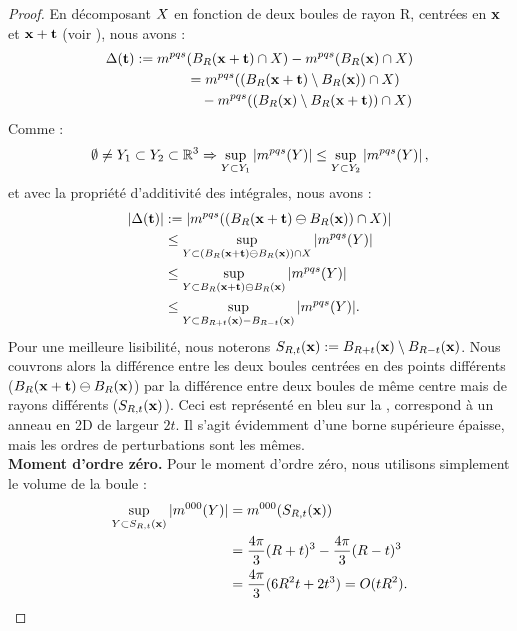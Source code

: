 \begin{proof}
En décomposant $X$ en fonction de deux boules de rayon R, centrées en $\mathbf{x}$
et $\mathbf{x} + \mathbf{t}$ (voir ), nous avons :
%
\begin{align}
  \Delta(\mathbf{t}) := m^{pqs}&(B_{R}(\mathbf{x}+\mathbf{t}) \cap X ) - m^{pqs}(B_{R}(\mathbf{x}) \cap X ) \\
    &= m^{pqs}( (B_{R}(\mathbf{x}+\mathbf{t}) \setminus B_{R}(\mathbf{x})) \cap X ) \\
    & \quad - m^{pqs}( (B_{R}(\mathbf{x}) \setminus B_{R}(\mathbf{x}+\mathbf{t})) \cap X )
\end{align}
%
Comme :
%
\begin{equation}
  \emptyset \neq Y_1 \subset Y_2 \subset \mathbb{R}^3 \Rightarrow \sup_{ Y \subset Y_1} \left | m^{pqs}(Y) \right| \le \sup_{Y \subset Y_2} \left| m^{pqs}(Y)\right |,
\end{equation}
%
et avec la propriété d'additivité des intégrales, nous avons :
%
\begin{align}
  |\Delta(\mathbf{t})| &:= |m^{pqs}( (B_{R}(\mathbf{x}+\mathbf{t}) \ominus B_{R}(\mathbf{x})) \cap X )| \\
  &\le \sup_{Y \subset (B_{R}(\mathbf{x}+\mathbf{t}) \ominus B_{R}(\mathbf{x})) \cap X} |m^{pqs}(Y)|\\
  &\le \sup_{Y \subset B_{R}(\mathbf{x}+\mathbf{t}) \ominus B_{R}(\mathbf{x})} |m^{pqs}(Y)|\\
  &\le \sup_{Y \subset B_{R+t}(\mathbf{x}) - B_{R-t}(\mathbf{x})} |m^{pqs}(Y)|.
\end{align}
%
Pour une meilleure lisibilité, nous noterons $S_{R,t}(\mathbf{x}) :=
B_{R+t}(\mathbf{x}) \setminus B_{R-t}(\mathbf{x})$. Nous couvrons alors la différence
entre les deux boules centrées en des points différents ($B_{R}(\mathbf{x}+\mathbf{t})
\ominus B_{R}(\mathbf{x})$) par la différence entre deux boules de même centre mais
de rayons différents ($S_{R,t}(\mathbf{x})$). Ceci est représenté
en bleu sur la , correspond à un anneau en 2D de
largeur $2t$. Il s'agit évidemment d'une borne supérieure épaisse, mais les
ordres de perturbations sont les mêmes.
%
\textbf{\\Moment d'ordre zéro.\quad}
%
Pour le moment d'ordre zéro, nous utilisons simplement le volume de la boule :
%
\begin{align}
  \sup_{Y \subset S_{R,t}(\mathbf{x})} |m^{000}(Y)|
  &= m^{000}( S_{R,t}(\mathbf{x}) ) \\
  &= \frac{4\pi}{3}(R+t)^3 - \frac{4\pi}{3}(R-t)^3 \\
  &= \frac{4\pi}{3}(6R^2t+2t^3)=O(tR^2).
\end{align}

\end{proof}
